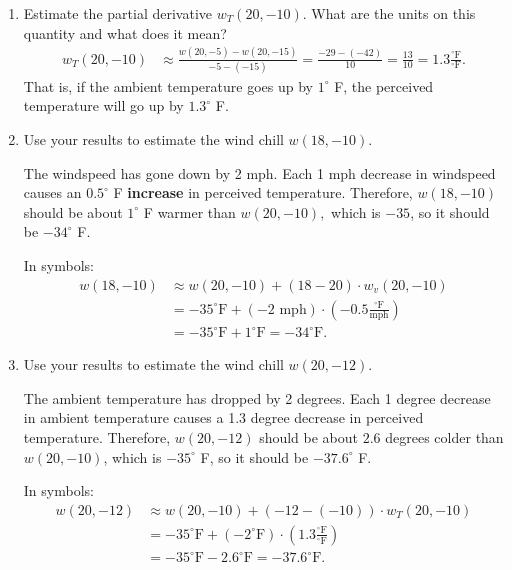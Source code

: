 \documentclass[10pt]{article}
\newenvironment{red}{\color{red}}{\ignorespacesafterend}
\begin{document}
\begin{enumerate}[leftmargin=0pt]
\begin{enumerate}
    \item Estimate the partial derivative $w_T(20,-10)$. What are the units on this quantity and what does it mean?
    \begin{red}
    \begin{align*}
        w_T(20,-10) &\approx 
        \frac{w(20, -5) - w(20,-15)}{-5 - (-15)} = 
        \frac{-29-(-42)}{10} = \frac{13}{10} = 1.3 \frac{^\circ \textrm{F}}{^\circ\textrm{F}}.
    \end{align*}
    That is, if the ambient temperature goes up by $1^\circ$ F, the perceived temperature will go up by $1.3^\circ$ F.
    \end{red}
    
    \item Use your results to estimate the wind chill $w(18, -10)$.
    
    \begin{red}
    The windspeed has gone down by 2 mph. Each 1 mph decrease in windspeed causes an $0.5^\circ$ F \textbf{increase} in perceived temperature. Therefore, $w(18, -10)$ should be about $1^\circ$ F warmer than $w(20, -10),$ which is $-35$, so it should be $-34^\circ$ F.
    
    In symbols: 
    \begin{align*}
        w(18, -10) &\approx w(20, -10) + (18-20) \cdot w_v(20, -10) \\
        &= -35^\circ \textrm{F} + (-2\textrm{ mph})\cdot \left(-0.5 \frac{^\circ \textrm{F}}{\textrm{mph}}\right) \\
        &= -35^\circ \textrm{F} + 1^\circ \textrm{F} = -34^\circ \textrm{F}.
    \end{align*}
    \end{red}
    
    \item Use your results to estimate the wind chill $w(20, -12)$.
    
    \begin{red}
    The ambient temperature has dropped by 2 degrees. Each 1 degree decrease in ambient temperature causes a 1.3 degree decrease in perceived temperature. Therefore, $w(20, -12)$ should be about $2.6$ degrees colder than $w(20, -10)$, which is $-35^\circ$ F, so it should be $-37.6^\circ$ F.
    
    In symbols: 
    \begin{align*}
        w(20, -12) &\approx w(20, -10) + (-12-(-10)) \cdot w_T(20, -10) \\
        &= -35^\circ \textrm{F} + (-2^\circ\textrm{F})\cdot \left(1.3 \frac{^\circ \textrm{F}}{^\circ \textrm{F}}\right) \\
        &= -35^\circ \textrm{F} -2.6^\circ \textrm{F} = -37.6^\circ \textrm{F}.
    \end{align*}
    \end{red}
    

\end{enumerate}
\end{enumerate}
\end{document}
